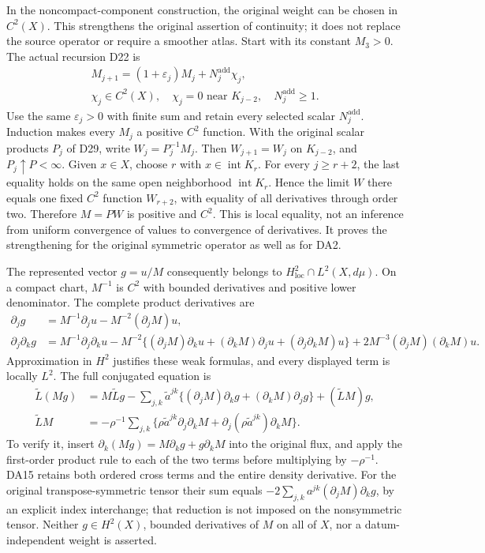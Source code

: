 \documentclass[
  11pt,
]{article}
\begin{document}
In the noncompact-component construction, the original weight can be
chosen in \(C^2(X)\). This strengthens the original assertion of
continuity; it does not replace the source operator or require a
smoother atlas. Start with its constant \(M_3>0\). The actual recursion
D22 is \[
 \begin{gathered}
 M_{j+1}=(1+\varepsilon_j)M_j+N_j^{\mathrm{add}}\chi_j,\\
 \chi_j\in C^2(X),\quad\chi_j=0\text{ near }K_{j-2},
 \quad N_j^{\mathrm{add}}\geq1.
 \end{gathered}\tag{DA13}
\] Use the same \(\varepsilon_j>0\) with finite sum and retain every
selected scalar \(N_j^{\mathrm{add}}\). Induction makes every \(M_j\) a
positive \(C^2\) function. With the original scalar products \(P_j\) of
D29, write \(W_j=P_j^{-1}M_j\). Then \(W_{j+1}=W_j\) on \(K_{j-2}\), and
\(P_j\uparrow P<\infty\). Given \(x\in X\), choose \(r\) with
\(x\in\operatorname{int}K_r\). For every \(j\geq r+2\), the last
equality holds on the same open neighborhood \(\operatorname{int}K_r\).
Hence the limit \(W\) there equals one fixed \(C^2\) function
\(W_{r+2}\), with equality of all derivatives through order two.
Therefore \(M=PW\) is positive and \(C^2\). This is local equality, not
an inference from uniform convergence of values to convergence of
derivatives. It proves the strengthening for the original symmetric
operator as well as for DA2.

The represented vector \(g=u/M\) consequently belongs to
\(H^2_{\mathrm{loc}}\cap L^2(X,d\mu)\). On a compact chart, \(M^{-1}\)
is \(C^2\) with bounded derivatives and positive lower denominator. The
complete product derivatives are \[
 \begin{split}
 \partial_jg&=M^{-1}\partial_ju-M^{-2}(\partial_jM)u,\\
 \partial_j\partial_kg
 &=M^{-1}\partial_j\partial_ku
   -M^{-2}\{(\partial_jM)\partial_ku+(\partial_kM)\partial_ju
                         +(\partial_j\partial_kM)u\}
   +2M^{-3}(\partial_jM)(\partial_kM)u.
 \end{split}\tag{DA14}
\] Approximation in \(H^2\) justifies these weak formulas, and every
displayed term is locally \(L^2\). The full conjugated equation is \[
 \begin{split}
 \widetilde L(Mg)
 &=M\widetilde Lg
   -\sum_{j,k}\widetilde a^{jk}
       \{(\partial_jM)\partial_kg+(\partial_kM)\partial_jg\}
   +(\widetilde LM)g,\\
 \widetilde LM
 &=-\rho^{-1}\sum_{j,k}
   \{\rho\widetilde a^{jk}\partial_j\partial_kM
             +\partial_j(\rho\widetilde a^{jk})\partial_kM\}.
 \end{split}\tag{DA15}
\] To verify it, insert \(\partial_k(Mg)=M\partial_kg+g\partial_kM\)
into the original flux, and apply the first-order product rule to each
of the two terms before multiplying by \(-\rho^{-1}\). DA15 retains both
ordered cross terms and the entire density derivative. For the original
transpose-symmetric tensor their sum equals
\(-2\sum_{j,k}a^{jk}(\partial_jM)\partial_kg\), by an explicit index
interchange; that reduction is not imposed on the nonsymmetric tensor.
Neither \(g\in H^2(X)\), bounded derivatives of \(M\) on all of \(X\),
nor a datum-independent weight is asserted.
\end{document}
